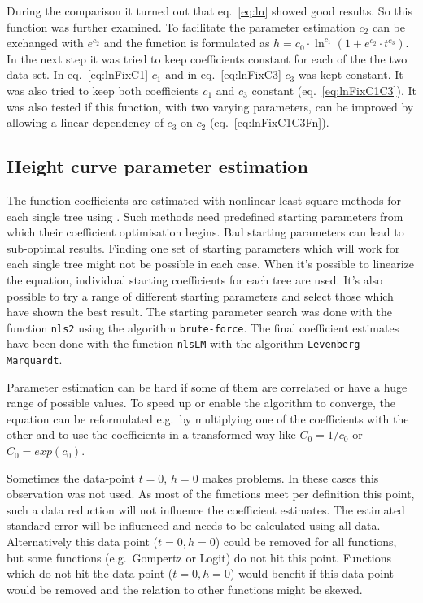 \documentclass[a4paper,twocolumn]{article}
\begin{document}
During the comparison it turned out that eq.~\ref{eq:ln} showed good
results. So this function was further examined. To facilitate the
parameter estimation $c_2$ can be exchanged with $e^{c_2}$ and the
function is formulated as $h = c_0\cdot \ln^{c_1}(1 + e^{c_2} \cdot
t^{c_3})$. In the next step it was tried to keep coefficients constant
for each of the the two data-set. In eq.~\ref{eq:lnFixC1} $c_1$ and in
eq.~\ref{eq:lnFixC3} $c_3$ was kept constant. It was also tried to
keep both coefficients $c_1$ and $c_3$ constant
(eq.~\ref{eq:lnFixC1C3}). It was also tested if this function, with
two varying parameters, can be improved by allowing a linear
dependency of $c_3$ on $c_2$ (eq.~\ref{eq:lnFixC1C3Fn}).

\subsection{Height curve parameter estimation}

The function coefficients are estimated with nonlinear least square
methods for each single tree using \cite{r2015}. Such methods need
predefined starting parameters from which their coefficient
optimisation begins. Bad starting parameters can lead to sub-optimal
results. Finding one set of starting parameters which will work for
each single tree might not be possible in each case. When it's
possible to linearize the equation, individual starting coefficients
for each tree are used. It's also possible to try a range of different
starting parameters and select those which have shown the best result. The
starting parameter search was done with the function {\tt nls2}
\citep{nls2_2013,proto2012}
using the algorithm {\tt brute-force}. The final coefficient estimates
have been done with the function {\tt nlsLM} \citep{minpackLm2015}
with the algorithm {\tt Levenberg-Marquardt}.

Parameter estimation can be hard
if some of them are correlated or have a huge range of possible
values. To speed up or enable the algorithm to converge, the equation
can be reformulated e.g.\ by multiplying one of the coefficients with
the other and to use the coefficients in a transformed way like $C_0 =
1/c_0$ or $C_0 = exp(c_0)$.

Sometimes the data-point $t=0$, $h=0$
makes problems. In these cases this observation was not used. As most
of the functions meet per definition this point, such a data reduction
will not influence the coefficient estimates. The estimated
standard-error will be influenced and needs to be calculated using
all data. Alternatively this data point ($t=0, h=0$) could be removed
for all functions, but some functions (e.g.\ Gompertz or Logit) do not
hit this point. Functions which do not hit the data point ($t=0, h=0$)
would benefit if this data point would be removed and the relation to
other functions might be skewed.
\end{document}
